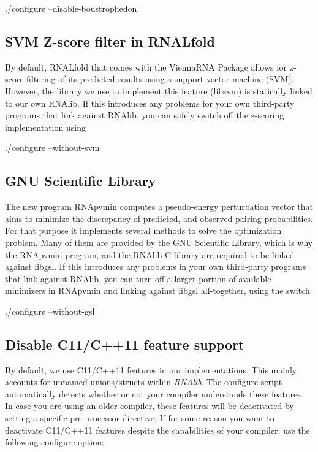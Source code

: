 \begin{DoxyVerb}./configure --disable-boustrophedon
\end{DoxyVerb}
\hypertarget{install_config_svm}{}\subsection{S\+V\+M Z-\/score filter in R\+N\+A\+Lfold}\label{install_config_svm}
By default, R\+N\+A\+Lfold that comes with the Vienna\+R\+NA Package allows for z-\/score filtering of its predicted results using a support vector machine (S\+VM). However, the library we use to implement this feature (libsvm) is statically linked to our own R\+N\+Alib. If this introduces any problems for your own third-\/party programs that link against R\+N\+Alib, you can safely switch off the z-\/scoring implementation using

\begin{DoxyVerb}./configure --without-svm
\end{DoxyVerb}
\hypertarget{install_config_gsl}{}\subsection{G\+N\+U Scientific Library}\label{install_config_gsl}
The new program R\+N\+Apvmin computes a pseudo-\/energy perturbation vector that aims to minimize the discrepancy of predicted, and observed pairing probabilities. For that purpose it implements several methods to solve the optimization problem. Many of them are provided by the G\+NU Scientific Library, which is why the R\+N\+Apvmin program, and the R\+N\+Alib C-\/library are required to be linked against libgsl. If this introduces any problems in your own third-\/party programs that link against R\+N\+Alib, you can turn off a larger portion of available minimizers in R\+N\+Apvmin and linking against libgsl all-\/together, using the switch

\begin{DoxyVerb}./configure --without-gsl
\end{DoxyVerb}
\hypertarget{install_config_c11}{}\subsection{Disable C11/\+C++11 feature support}\label{install_config_c11}
By default, we use C11/\+C++11 features in our implementations. This mainly accounts for unnamed unions/structs within {\itshape R\+N\+Alib}. The configure script automatically detects whether or not your compiler understands these features. In case you are using an older compiler, these features will be deactivated by setting a specific pre-\/processor directive. If for some reason you want to deactivate C11/\+C++11 features despite the capabilities of your compiler, use the following configure option\+:

